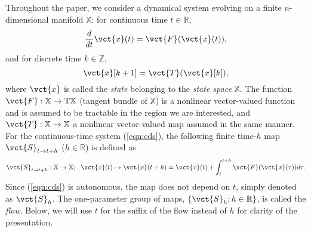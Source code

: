\documentclass[a4paper,10pt]{article}
\def\bbR{{\mathbb{R}}}
\def\bbZ{{\mathbb{Z}}}
\def\bbX{{\mathbb{X}}}
\begin{document}
Throughout the paper, we consider a dynamical system evolving on a finite $n$-dimensional manifold $\bbX$:  for continuous time $t\in\bbR$,
\begin{equation}
\frac{d}{dt}\vct{x}(t)=\vct{F}(\vct{x}(t)),
\label{eqn:cds}
\end{equation}
and for discrete time $k\in\bbZ$,
\begin{equation}
\vct{x}[k+1]=\vct{T}(\vct{x}[k]),
\label{eqn:dds}
\end{equation}  
where $\vct{x}$ is called the \emph{state} belonging to the \emph{state space} $\bbX$.  
The function $\vct{F}: \bbX\to\mathrm{T}\mathbb{X}$ (tangent bundle of $\mathbb{X}$) is a nonlinear vector-valued function and is assumed to be tractable in the region we are interested, and $\vct{T}: \bbX\to\bbX$ a nonlinear vector-valued map assumed in the same manner.  
For the continuous-time system (\ref{eqn:cds}), the following finite time-$h$ map $\vct{S}_{t\to t+h}$ ($h\in\bbR$) is defined as
\[
\vct{S}_{t\to t+h}: \bbX\to\bbX;~~\vct{x}(t)\mapsto\vct{x}(t+h)=\vct{x}(t)
+\int^{t+h}_t\vct{F}(\vct{x}(\tau))d\tau.
\]
Since (\ref{eqn:cds}) is autonomous, the map does not depend on $t$, simply denoted as $\vct{S}_h$.  
The one-parameter group of maps, $\{\vct{S}_h; h\in\bbR\}$, is called the \emph{flow}.  
Below, we will use $t$ for the suffix of the flow instead of $h$ for clarity of the presentation.  
\end{document}
